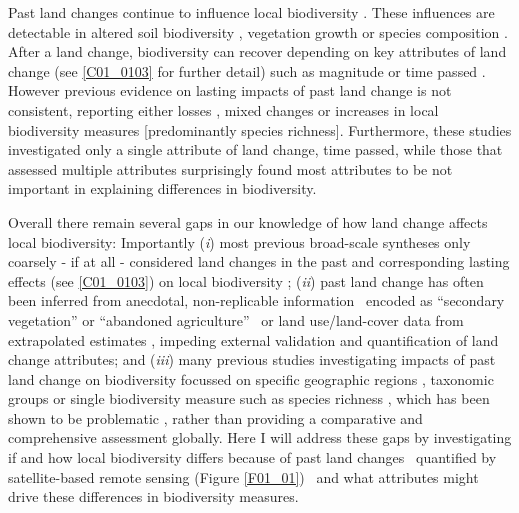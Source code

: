 Past land changes continue to influence local biodiversity \citep{Foster2003}. These influences are detectable in altered soil biodiversity \citep{Jakovac2016,Wood2017}, vegetation growth \citep{Fraterrigo2006} or species composition \citep{Bellemare2002,Ewers2013,Jakovac2016}. After a land change, biodiversity can recover \citep{Chazdon2003} depending on key attributes of land change (see \ref{C01_0103} for further detail) such as magnitude or time passed \citep{Martin2013,Fu2017,Jones2018}. However previous evidence on lasting impacts of past land change is not consistent, reporting either losses \citep{Moreno-Mateos2017,Jones2018}, mixed changes \citep{Svensson2012,Thom2016} or increases \citep{Fu2017} in local biodiversity measures [predominantly species richness]. Furthermore, these studies investigated only a single attribute of land change, \eg time passed, while those that assessed multiple attributes \citep{Shackelford2017} surprisingly found most attributes to be not important in explaining differences in biodiversity.

Overall there remain several gaps in our knowledge of how land change affects local biodiversity: Importantly (\textit{i}) most previous broad-scale syntheses only coarsely - if at all - considered land changes in the past \citep{Alkemade2009,Murphy2014,Newbold2015} and corresponding lasting effects (see \ref{C01_0103}) on local biodiversity \citep{Dullinger2013,Hylander2013}; (\textit{ii}) past land change has often been inferred from anecdotal, non-replicable information \textendash\ \ie encoded as “secondary vegetation” \citep{Hudson2014} or “abandoned agriculture” \citep{Gibson2011} \textendash\ or land use/land-cover data from extrapolated estimates \citep{Hurtt2011}, impeding external validation and quantification of land change attributes; and (\textit{iii}) many previous studies investigating impacts of past land change on biodiversity focussed on specific geographic regions \citep{Bellemare2002,Ewers2013,Cousins2015}, taxonomic groups \citep{Hermy2007,Perring2018} or single biodiversity measure such as species richness \citep{Martin2013,Fu2017}, which has been shown to be problematic \citep{Su2004,Hillebrand2017}, rather than providing a comparative and comprehensive assessment globally. Here I will address these gaps by investigating if and how local biodiversity differs because of past land changes \textendash\ quantified by satellite-based remote sensing (Figure \ref{F01_01}) \textendash\ and what attributes might drive these differences in biodiversity measures.


